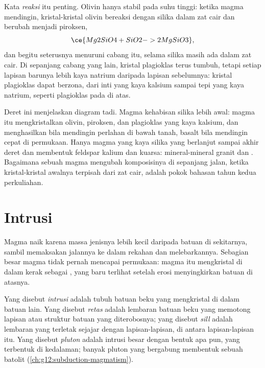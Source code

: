 Kata \emph{reaksi} itu penting. Olivin hanya stabil pada suhu tinggi: ketika
magma mendingin, kristal-kristal olivin bereaksi dengan silika dalam zat cair
dan berubah menjadi piroksen,
\[
  \ce{Mg2SiO4 + SiO2 -> 2 MgSiO3},
\]
dan begitu seterusnya menuruni cabang itu, selama silika masih ada dalam zat
cair. Di sepanjang cabang yang lain, kristal plagioklas terus tumbuh, tetapi
setiap lapisan barunya lebih kaya natrium daripada lapisan sebelumnya: kristal
plagioklas dapat berzona, dari inti yang kaya kalsium sampai tepi yang kaya
natrium, seperti  plagioklas pada  di atas.

Deret ini menjelaskan diagram tadi. Magma  kehabisan silika lebih awal:
magma itu mengkristalkan olivin, piroksen, dan plagioklas yang kaya kalsium, dan
menghasilkan  bila mendingin perlahan di bawah tanah, basalt bila
mendingin cepat di permukaan. Hanya magma yang kaya silika yang berlanjut
sampai akhir deret dan membentuk feldspar kalium dan kuarsa: mineral-mineral
granit dan . Bagaimana sebuah magma mengubah komposisinya di sepanjang
jalan, ketika kristal-kristal awalnya terpisah dari zat cair, adalah pokok
bahasan tahun kedua perkuliahan.

\section{Intrusi}

Magma naik karena massa jenisnya lebih kecil daripada batuan di sekitarnya,
sambil memaksakan jalannya ke dalam rekahan dan melebarkannya. Sebagian besar
magma tidak pernah mencapai permukaan: magma itu mengkristal di dalam kerak
sebagai , yang baru terlihat setelah erosi menyingkirkan batuan di
atasnya.

\begin{definition}\label{def:g11:igneous-rocks:intrusion}
Yang disebut \emph{intrusi} adalah tubuh batuan beku yang
mengkristal di dalam batuan lain. Yang disebut \emph{retas} adalah
lembaran batuan beku yang memotong lapisan atau struktur batuan yang
diterobosnya; yang disebut \emph{sill} adalah lembaran yang
terletak sejajar dengan lapisan-lapisan, di antara lapisan-lapisan itu. Yang
disebut \emph{pluton} adalah intrusi besar dengan bentuk apa
pun, yang terbentuk di kedalaman; banyak pluton yang bergabung membentuk
sebuah batolit (\cref{ch:g12:subduction-magmatism}).
\end{definition}

